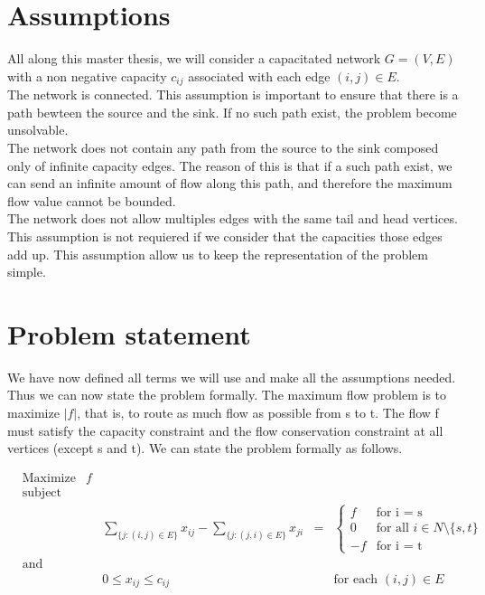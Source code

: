 \section{Assumptions}

All along this master thesis, we will  consider a capacitated network $G = (V, E)$ with a non negative capacity $c_{ij}$ associated with each edge $(i, j) \in E$.\\


The network is connected. This assumption is important to ensure that there is a path bewteen the source and the sink. If no such path exist, the problem become unsolvable.\\

The network does not contain any path from the source to the sink composed only of infinite capacity edges. The reason of this is that if a such path exist, we can send an infinite amount of flow along this path, and therefore the maximum flow value cannot be bounded. \\

The network does not allow multiples edges with the same tail and head vertices. This assumption is not requiered if we consider that the capacities those edges add up. This assumption allow us to keep the representation of the problem simple.

\section{Problem statement}

We have now defined all terms we will use and make all the assumptions needed. Thus we can now state the problem formally. The maximum flow problem is to maximize $\left\vert{f}\right\vert$, that is, to route as much flow as possible from s to t. The flow f must satisfy the capacity constraint and the flow conservation constraint at all vertices (except s and t). We can state the problem formally as follows.

\begin{equation}
\begin{aligned}
& {\text{Maximize}} & f & & &\\
& \text{subject to} & & & &\\
& & & \sum\limits_{\{j:(i,j)\in E\}} x_{ij} - \sum\limits_{\{j:(j,i)\in E\}} x_{ji} & = & \begin{cases}
               f & \text{for i = s} \\
               0 & \text{for all } i \in N \setminus \{s, t\} \\
               -f & \text{for i = t}
            \end{cases}\\
& \text{and} & & & & \\
& & & 0 \leq x_{ij} \leq c_{ij} & & \text{for each } (i, j) \in E
\end{aligned}
\end{equation}

